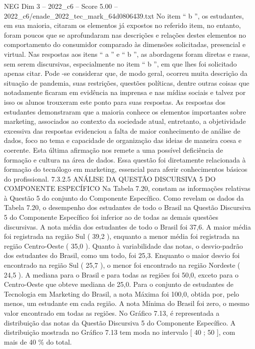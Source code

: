\begin{textsample}{NEG Dim 3 – 2022\_c6 – Score 5.00 – 2022\_c6/enade\_2022\_tec\_mark\_64d0806439.txt}
No item “ b ”, os estudantes, em sua maioria, citaram os elementos já expostos no referido item, no entanto, foram poucos que se aprofundaram nas descrições e relações destes elementos no comportamento do consumidor comparado às dimensões solicitadas, presencial e virtual.
Nas respostas aos itens “ a ” e “ b ”, as abordagens foram diretas e rasas, sem serem discursivas, especialmente no item “ b ”, em que lhes foi solicitado apenas citar.
Pode -se considerar que, de modo geral, ocorreu muita descrição da situação de pandemia, suas restrições, questões políticas, dentre outras coisas que notadamente ficaram em evidência na imprensa e nas mídias sociais e talvez por isso os alunos trouxeram este ponto para suas respostas.
As respostas dos estudantes demonstraram que a maioria conhece os elementos importantes sobre marketing, associados ao contexto da sociedade atual, entretanto, a objetividade excessiva das respostas evidenciou a falta de maior conhecimento de análise de dados, foco no tema e capacidade de organização das ideias de maneira coesa e coerente.
Esta última afirmação nos remete a uma possível deficiência de formação e cultura na área de dados.
Essa questão foi diretamente relacionada à formação do tecnólogo em marketing, essencial para aferir conhecimentos básicos do profissional. 7.3.2.5 ANÁLISE DA QUESTÃO DISCURSIVA 5 DO COMPONENTE ESPECÍFICO Na Tabela 7.20, constam as informações relativas à Questão 5 do conjunto do Componente Específico.
Como revelam os dados da Tabela 7.20, o desempenho dos estudantes de todo o Brasil na Questão Discursiva 5 do Componente Específico foi inferior ao de todas as demais questões discursivas.
A nota média dos estudantes de todo o Brasil foi 37,6.
A maior média foi registrada na região Sul ( 39,2 ), enquanto a menor média foi registrada na região Centro-Oeste ( 35,0 ).
Quanto à variabilidade das notas, o desvio-padrão dos estudantes do Brasil, como um todo, foi 25,3.
Enquanto o maior desvio foi encontrado na região Sul ( 25,7 ), o menor foi encontrado na região Nordeste ( 24,5 ).
A mediana para o Brasil e para todas as regiões foi 50,0, exceto para o Centro-Oeste que obteve mediana de 25,0.
Para o conjunto de estudantes de Tecnologia em Marketing do Brasil, a nota Máxima foi 100,0, obtida por, pelo menos, um estudante em cada região.
A nota Mínima do Brasil foi zero, o mesmo valor encontrado em todas as regiões.
No Gráfico 7.13, é representada a distribuição das notas da Questão Discursiva 5 do Componente Específico.
A distribuição mostrada no Gráfico 7.13 tem moda no intervalo [ 40 ; 50 ], com mais de 40 \% do total.

\end{textsample}
